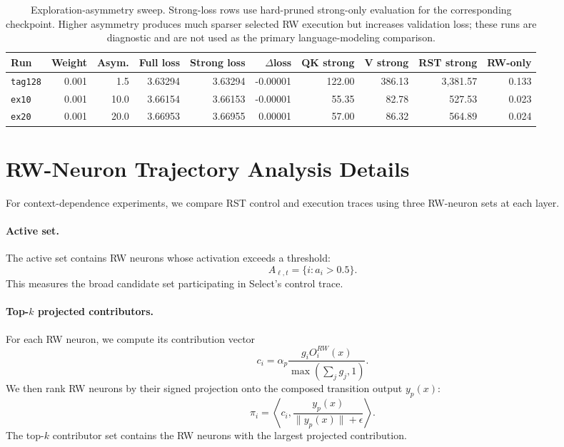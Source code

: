 \documentclass{article}
\begin{document}
\begin{table}[t]
\centering
\small
\setlength{\tabcolsep}{4pt}
\renewcommand{\arraystretch}{1.08}
\begin{tabular}{lrrrrrrrrr}
\toprule
Run & Weight & Asym. & Full loss & Strong loss & $\Delta$loss & QK strong & V strong & RST strong & RW-only \\
\midrule
\texttt{tag128} & 0.001 & 1.5 & 3.63294 & 3.63294 & -0.00001 & 122.00 & 386.13 & 3,381.57 & 0.133 \\
\texttt{ex10} & 0.001 & 10.0 & 3.66154 & 3.66153 & -0.00001 & 55.35 & 82.78 & 527.53 & 0.023 \\
\texttt{ex20} & 0.001 & 20.0 & 3.66953 & 3.66955 & 0.00001 & 57.00 & 86.32 & 564.89 & 0.024 \\
\bottomrule
\end{tabular}
\caption{Exploration-asymmetry sweep. Strong-loss rows use hard-pruned strong-only evaluation for the corresponding checkpoint. Higher asymmetry produces much sparser selected RW execution but increases validation loss; these runs are diagnostic and are not used as the primary language-modeling comparison.}
\label{tab:exploration_sweep}
\end{table}

\section{RW-Neuron Trajectory Analysis Details}
\label{app:analysis_quantities}

For context-dependence experiments, we compare RST control and execution traces using three RW-neuron sets at each layer.

\paragraph{Active set.}
The active set contains RW neurons whose activation exceeds a threshold:
\begin{equation}
    A_{\ell,t} = \{i : a_i > 0.5\}.
\end{equation}
This measures the broad candidate set participating in Select's control trace.

\paragraph{Top-$k$ projected contributors.}
For each RW neuron, we compute its contribution vector
\begin{equation}
    c_i = \alpha_p \frac{g_i O_i^{RW}(x)}{\max(\sum_j g_j,1)}.
\end{equation}
We then rank RW neurons by their signed projection onto the composed transition output $y_p(x)$:
\begin{equation}
    \pi_i = \left\langle c_i, \frac{y_p(x)}{\|y_p(x)\| + \epsilon} \right\rangle .
\end{equation}
The top-$k$ contributor set contains the RW neurons with the largest projected contribution.
\end{document}
